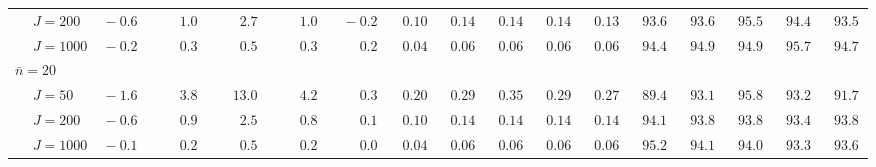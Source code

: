 \begin{sidewaystable}
\begin{threeparttable}
\begin{tabular}{llccccccccccccccc}
 & \nopagebreak $\;J=200$  & $\phantom{0}{-}0.6\phantom{0}$ & $\phantom{0}\phantom{-}1.0\phantom{0}$ & $\phantom{0}\phantom{-}2.7\phantom{0}$ & $\phantom{0}\phantom{-}1.0\phantom{0}$ & $\phantom{0}{-}0.2\phantom{0}$ & $\phantom{0}0.10\phantom{0}$ & $\phantom{0}0.14\phantom{0}$ & $\phantom{0}0.14\phantom{0}$ & $\phantom{0}0.14\phantom{0}$ & $\phantom{0}0.13\phantom{0}$ & $\phantom{0}93.6\phantom{0}$ & $\phantom{0}93.6\phantom{0}$ & $\phantom{0}95.5\phantom{0}$ & $\phantom{0}94.4\phantom{0}$ & $\phantom{0}93.5\phantom{0}$ \\
 & \nopagebreak $\;J=1000$  & $\phantom{0}{-}0.2\phantom{0}$ & $\phantom{0}\phantom{-}0.3\phantom{0}$ & $\phantom{0}\phantom{-}0.5\phantom{0}$ & $\phantom{0}\phantom{-}0.3\phantom{0}$ & $\phantom{0}\phantom{-}0.2\phantom{0}$ & $\phantom{0}0.04\phantom{0}$ & $\phantom{0}0.06\phantom{0}$ & $\phantom{0}0.06\phantom{0}$ & $\phantom{0}0.06\phantom{0}$ & $\phantom{0}0.06\phantom{0}$ & $\phantom{0}94.4\phantom{0}$ & $\phantom{0}94.9\phantom{0}$ & $\phantom{0}94.9\phantom{0}$ & $\phantom{0}95.7\phantom{0}$ & $\phantom{0}94.7\phantom{0}$ \\
\multicolumn{4}{l}{$\bar{n}=20$} \\  & \nopagebreak $\;J=50$  & $\phantom{0}{-}1.6\phantom{0}$ & $\phantom{0}\phantom{-}3.8\phantom{0}$ & $\phantom{-}13.0\phantom{0}$ & $\phantom{0}\phantom{-}4.2\phantom{0}$ & $\phantom{0}\phantom{-}0.3\phantom{0}$ & $\phantom{0}0.20\phantom{0}$ & $\phantom{0}0.29\phantom{0}$ & $\phantom{0}0.35\phantom{0}$ & $\phantom{0}0.29\phantom{0}$ & $\phantom{0}0.27\phantom{0}$ & $\phantom{0}89.4\phantom{0}$ & $\phantom{0}93.1\phantom{0}$ & $\phantom{0}95.8\phantom{0}$ & $\phantom{0}93.2\phantom{0}$ & $\phantom{0}91.7\phantom{0}$ \\
 & \nopagebreak $\;J=200$  & $\phantom{0}{-}0.6\phantom{0}$ & $\phantom{0}\phantom{-}0.9\phantom{0}$ & $\phantom{0}\phantom{-}2.5\phantom{0}$ & $\phantom{0}\phantom{-}0.8\phantom{0}$ & $\phantom{0}\phantom{-}0.1\phantom{0}$ & $\phantom{0}0.10\phantom{0}$ & $\phantom{0}0.14\phantom{0}$ & $\phantom{0}0.14\phantom{0}$ & $\phantom{0}0.14\phantom{0}$ & $\phantom{0}0.14\phantom{0}$ & $\phantom{0}94.1\phantom{0}$ & $\phantom{0}93.8\phantom{0}$ & $\phantom{0}93.8\phantom{0}$ & $\phantom{0}93.4\phantom{0}$ & $\phantom{0}93.8\phantom{0}$ \\
 & \nopagebreak $\;J=1000$  & $\phantom{0}{-}0.1\phantom{0}$ & $\phantom{0}\phantom{-}0.2\phantom{0}$ & $\phantom{0}\phantom{-}0.5\phantom{0}$ & $\phantom{0}\phantom{-}0.2\phantom{0}$ & $\phantom{0}\phantom{-}0.0\phantom{0}$ & $\phantom{0}0.04\phantom{0}$ & $\phantom{0}0.06\phantom{0}$ & $\phantom{0}0.06\phantom{0}$ & $\phantom{0}0.06\phantom{0}$ & $\phantom{0}0.06\phantom{0}$ & $\phantom{0}95.2\phantom{0}$ & $\phantom{0}94.1\phantom{0}$ & $\phantom{0}94.0\phantom{0}$ & $\phantom{0}93.3\phantom{0}$ & $\phantom{0}93.6\phantom{0}$ \\

\end{tabular}
\end{threeparttable}
\end{sidewaystable}
